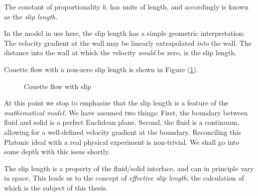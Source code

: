 \documentclass[12pt, a4paper, twoside, openright]{book}
\begin{document}
The constant of proportionality $b$, has units of length, and accordingly is known as the \emph{slip length.}

In the model in use here, the slip length has a simple geometric interpretation: 
The velocity gradient at the wall may be linearly extrapolated \emph{into} the wall. The distance into the wall at which the velocity \emph{would} be zero, is the slip length.

Couette flow with a non-zero slip length is shown in Figure (\ref{Couetteslip}).

\begin{figure}[ht]
\centering
{}
\caption{Couette flow with slip} \label{Couetteslip}
\end{figure}

At this point we stop to emphasize that the slip length is a feature of the \emph{mathematical model.} We have assumed two things: First, the boundary between fluid and solid is a perfect Euclidean plane. Second, the fluid is a continuum, allowing for a well-defined velocity gradient at the boundary. Reconciling this Platonic ideal with a real physical experiment is non-trivial. We shall go into some depth with this issue shortly.

The slip length is a property of the fluid/solid interface, and can in principle vary in space. This leads us to the concept of \emph{effective slip length}, the calculation of which is the subject of this thesis.
\end{document}
